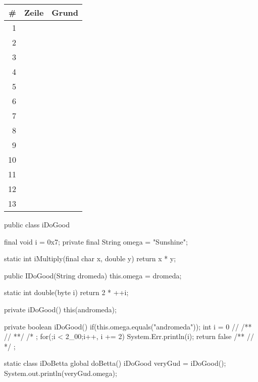 \documentclass[table]{sopra-base}
\begin{document}
\vfill
\def\arraystretch{1.85}
\begin{tabularx}{\linewidth}{rp{4em}X}
\toprule
    \# & Zeile & Grund\\
\midrule
    1 & & \\\midrule
    2 & & \\\midrule
    3 & & \\\midrule
    4 & & \\\midrule
    5 & & \\\midrule
    6 & & \\\midrule
    7 & & \\\midrule
    8 & & \\\midrule
    9 & & \\\midrule
   10 & & \\\midrule
   11 & & \\\midrule
   12 & & \\\midrule
   13 & & \\
\bottomrule
\end{tabularx}
\vfill
\clearpage\null\vfill
\lstset{lineskip=5.5pt}
\begin{plainvoid}[numbers=left,numbersep=6pt]
public class iDoGood {
    final void i = 0x7;
    private final String omega = "Sunshine";

    static int iMultiply(final char x, double y) {
        return x * y;
    }

    public IDoGood(String dromeda) {
        this.omega = dromeda;
    }

    static int double(byte i) {
        return 2 * ++i;
    }

    private iDoGood() {
        this(andromeda);
    }

    private boolean iDoGood() {
        if(this.omega.equals("andromeda"));
        int i = 0 // /** // **/ /* ;
        for(;i < 2_00;i++, i += 2)
            System.Err.println(i);
        return false /** // */ ;
    }

    static class iDoBetta {
        global doBetta() {
            iDoGood veryGud = iDoGood();
            System.out.println(veryGud.omega);
        }
    }
}
\end{plainvoid}
\vfill\null
\clearpage
{}
\strut
\end{document}
